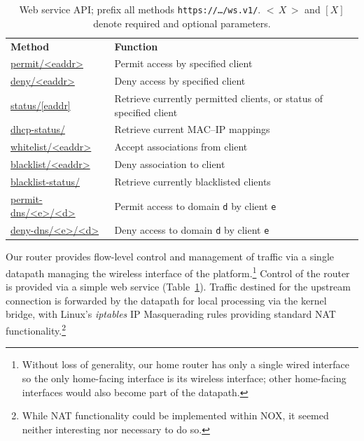 \begin{table}
  \begin{tabular} {p{}p{}} 
    \textbf{Method} & \textbf{Function} \\ 
    \url{permit/<eaddr>} & Permit access by specified client\\ 
    \url{deny/<eaddr>} & Deny access by specified client\\
    \url{status/[eaddr]} & Retrieve currently permitted clients, or status of specified client \\ 
    \url{dhcp-status/} & Retrieve current MAC--IP mappings\\
    \url{whitelist/<eaddr>} & Accept associations from client\\
    \url{blacklist/<eaddr>} & Deny association to client\\
    \url{blacklist-status/} & Retrieve currently blacklisted clients\\
    \url{permit-dns/<e>/<d>} & Permit access to domain \texttt{d} by client \texttt{e}\\ 
    \url{deny-dns/<e>/<d>} & Deny access to domain \texttt{d} by client \texttt{e}\\ 
  \end{tabular} 
  \caption{\label{t:api}Web service API;
    prefix all methods \texttt{https://\ldots/ws.v1/}.  $<$\,$X$\,$>$ and $[X]$
    denote required and optional parameters.}
\end{table}

Our router provides flow-level control and management of traffic via a single
\of datapath managing the wireless interface of the platform.\footnote{Without
  loss of generality, our home router has only a single wired interface so the
  only home-facing interface is its wireless interface; other home-facing
  interfaces would also become part of the \of datapath.} Control of the router
is provided via a simple web service (Table~\ref{t:api}).  Traffic destined for
the upstream connection is forwarded by the datapath for local processing via
the kernel bridge, with Linux's \emph{iptables} IP Masquerading rules providing
standard NAT functionality.\footnote{While NAT functionality could be
  implemented within NOX, it seemed neither interesting nor necessary to do so.}


